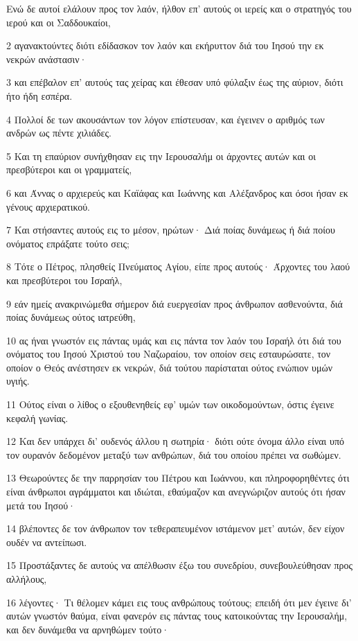 \par Ενώ δε αυτοί ελάλουν προς τον λαόν, ήλθον επ' αυτούς οι ιερείς και ο στρατηγός του ιερού και οι Σαδδουκαίοι,
\par 2 αγανακτούντες διότι εδίδασκον τον λαόν και εκήρυττον διά του Ιησού την εκ νεκρών ανάστασιν·
\par 3 και επέβαλον επ' αυτούς τας χείρας και έθεσαν υπό φύλαξιν έως της αύριον, διότι ήτο ήδη εσπέρα.
\par 4 Πολλοί δε των ακουσάντων τον λόγον επίστευσαν, και έγεινεν ο αριθμός των ανδρών ως πέντε χιλιάδες.
\par 5 Και τη επαύριον συνήχθησαν εις την Ιερουσαλήμ οι άρχοντες αυτών και οι πρεσβύτεροι και οι γραμματείς,
\par 6 και Άννας ο αρχιερεύς και Καϊάφας και Ιωάννης και Αλέξανδρος και όσοι ήσαν εκ γένους αρχιερατικού.
\par 7 Και στήσαντες αυτούς εις το μέσον, ηρώτων· Διά ποίας δυνάμεως ή διά ποίου ονόματος επράξατε τούτο σεις;
\par 8 Τότε ο Πέτρος, πλησθείς Πνεύματος Αγίου, είπε προς αυτούς· Άρχοντες του λαού και πρεσβύτεροι του Ισραήλ,
\par 9 εάν ημείς ανακρινώμεθα σήμερον διά ευεργεσίαν προς άνθρωπον ασθενούντα, διά ποίας δυνάμεως ούτος ιατρεύθη,
\par 10 ας ήναι γνωστόν εις πάντας υμάς και εις πάντα τον λαόν του Ισραήλ ότι διά του ονόματος του Ιησού Χριστού του Ναζωραίου, τον οποίον σεις εσταυρώσατε, τον οποίον ο Θεός ανέστησεν εκ νεκρών, διά τούτου παρίσταται ούτος ενώπιον υμών υγιής.
\par 11 Ούτος είναι ο λίθος ο εξουθενηθείς εφ' υμών των οικοδομούντων, όστις έγεινε κεφαλή γωνίας.
\par 12 Και δεν υπάρχει δι' ουδενός άλλου η σωτηρία· διότι ούτε όνομα άλλο είναι υπό τον ουρανόν δεδομένον μεταξύ των ανθρώπων, διά του οποίου πρέπει να σωθώμεν.
\par 13 Θεωρούντες δε την παρρησίαν του Πέτρου και Ιωάννου, και πληροφορηθέντες ότι είναι άνθρωποι αγράμματοι και ιδιώται, εθαύμαζον και ανεγνώριζον αυτούς ότι ήσαν μετά του Ιησού·
\par 14 βλέποντες δε τον άνθρωπον τον τεθεραπευμένον ιστάμενον μετ' αυτών, δεν είχον ουδέν να αντείπωσι.
\par 15 Προστάξαντες δε αυτούς να απέλθωσιν έξω του συνεδρίου, συνεβουλεύθησαν προς αλλήλους,
\par 16 λέγοντες· Τι θέλομεν κάμει εις τους ανθρώπους τούτους; επειδή ότι μεν έγεινε δι' αυτών γνωστόν θαύμα, είναι φανερόν εις πάντας τους κατοικούντας την Ιερουσαλήμ, και δεν δυνάμεθα να αρνηθώμεν τούτο·
